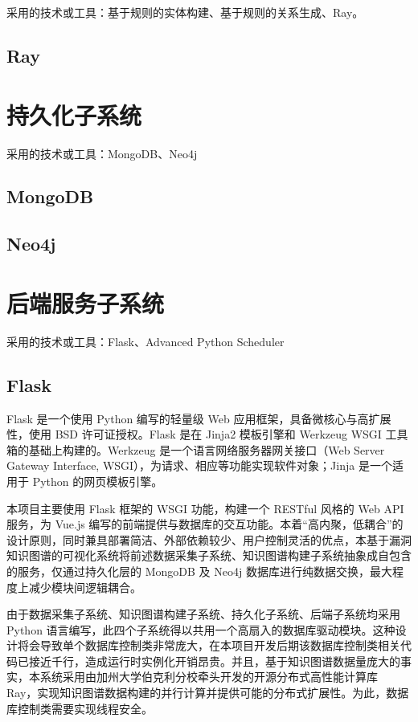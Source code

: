 \documentclass[a4paper,AutoFakeBold,oneside,12pt]{book}
\begin{document}
采用的技术或工具：基于规则的实体构建、基于规则的关系生成、Ray。

\subsection{Ray}

\section{持久化子系统}

采用的技术或工具：MongoDB、Neo4j

\subsection{MongoDB}

\subsection{Neo4j}

\section{后端服务子系统}

采用的技术或工具：Flask、Advanced Python Scheduler

\subsection{Flask}

Flask 是一个使用 Python 编写的轻量级 Web 应用框架，具备微核心与高扩展性，使用 BSD 许可证授权。Flask 是在 Jinja2 模板引擎和 Werkzeug WSGI 工具箱的基础上构建的。Werkzeug 是一个语言网络服务器网关接口（Web Server Gateway Interface, WSGI），为请求、相应等功能实现软件对象；Jinja 是一个适用于 Python 的网页模板引擎。

本项目主要使用 Flask 框架的 WSGI 功能，构建一个 RESTful 风格的 Web API 服务，为 Vue.js 编写的前端提供与数据库的交互功能。本着“高内聚，低耦合”的设计原则，同时兼具部署简洁、外部依赖较少、用户控制灵活的优点，本基于漏洞知识图谱的可视化系统将前述数据采集子系统、知识图谱构建子系统抽象成自包含的服务，仅通过持久化层的 MongoDB 及 Neo4j 数据库进行纯数据交换，最大程度上减少模块间逻辑耦合。

由于数据采集子系统、知识图谱构建子系统、持久化子系统、后端子系统均采用 Python 语言编写，此四个子系统得以共用一个高扇入的数据库驱动模块。这种设计将会导致单个数据库控制类非常庞大，在本项目开发后期该数据库控制类相关代码已接近千行，造成运行时实例化开销昂贵。并且，基于知识图谱数据量庞大的事实，本系统采用由加州大学伯克利分校牵头开发的开源分布式高性能计算库 Ray，实现知识图谱数据构建的并行计算并提供可能的分布式扩展性。为此，数据库控制类需要实现线程安全。
\end{document}

